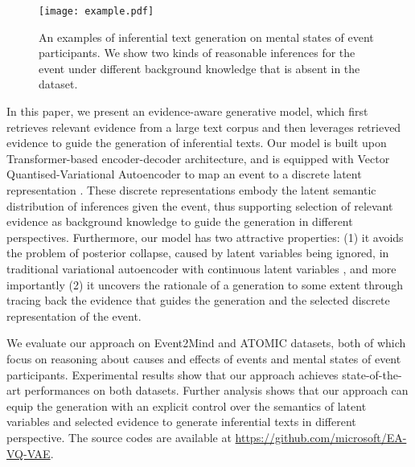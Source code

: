 \documentclass[11pt,a4paper]{article}
\begin{document}
\begin{figure}[t]
	\centering
	\texttt{[image: example.pdf]}
	\caption{An examples of inferential text generation on mental states of event participants. We show two kinds of reasonable inferences for the event under different background knowledge that is absent in the dataset.}
	\label{fig:example}
\end{figure}



In this paper, we present an evidence-aware generative model, which 
first retrieves relevant evidence from a large text corpus and then leverages retrieved evidence to guide the generation of inferential texts. 
Our model is built upon Transformer-based \cite{vaswani2017attention} encoder-decoder architecture, and is equipped with Vector Quantised-Variational Autoencoder to map an event to a discrete latent representation \cite{van2017neural}.
These discrete representations embody the latent semantic distribution of inferences given the event, thus supporting selection of relevant evidence as background knowledge to guide the generation in different perspectives.
Furthermore, 
our model has two attractive properties: (1) it avoids the problem of posterior collapse, caused by latent variables being ignored, in traditional variational autoencoder with continuous latent variables
\cite{van2017neural}, and more importantly (2) it uncovers the rationale of a generation to some extent through tracing back the evidence that guides the generation and the selected discrete representation of the event.















We evaluate our approach on Event2Mind \cite{rashkin2018event2mind} and ATOMIC \cite{sap2019atomic} datasets, both of which focus on reasoning about causes and effects of events and mental states of event participants. 
Experimental results show that our approach achieves state-of-the-art performances on both datasets.
Further analysis shows that our approach can equip the generation with an explicit control over the semantics of latent variables and selected evidence to generate inferential texts in different perspective. The source codes are available at \url{https://github.com/microsoft/EA-VQ-VAE}.
\end{document}
